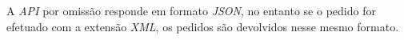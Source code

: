 
A \textit{API} por omissão responde em formato \textit{JSON}, no entanto se o pedido for efetuado com a extensão \textit{XML}, os pedidos são devolvidos nesse mesmo formato.
